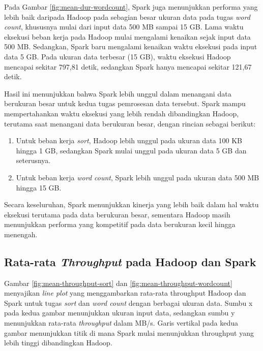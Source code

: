Pada Gambar \ref{fig:mean-dur-wordcount}, Spark juga menunjukkan performa yang lebih baik daripada Hadoop pada sebagian besar ukuran data pada tugas \textit{word count}, khususnya mulai dari input data 500 MB sampai 15 GB. Lama waktu eksekusi beban kerja pada Hadoop mulai mengalami kenaikan sejak input data 500 MB. Sedangkan, Spark baru mengalami kenaikan waktu eksekusi pada input data 5 GB. Pada ukuran data terbesar (15 GB), waktu eksekusi Hadoop mencapai sekitar 797,81 detik, sedangkan Spark hanya mencapai sekitar 121,67 detik.

Hasil ini menunjukkan bahwa Spark lebih unggul dalam menangani data berukuran besar untuk kedua tugas pemrosesan data tersebut. Spark mampu mempertahankan waktu eksekusi yang lebih rendah dibandingkan Hadoop, terutama saat menangani data berukuran besar, dengan rincian sebagai berikut:
\begin{enumerate}
\item Untuk beban kerja \textit{sort}, Hadoop lebih unggul pada ukuran data 100 KB hingga 1 GB, sedangkan Spark mulai unggul pada ukuran data 5 GB dan seterusnya.
\item Untuk beban kerja \textit{word count}, Spark lebih unggul pada ukuran data 500 MB hingga 15 GB.
\end{enumerate}

Secara keseluruhan, Spark menunjukkan kinerja yang lebih baik dalam hal waktu eksekusi terutama pada data berukuran besar, sementara Hadoop masih menunjukkan performa yang kompetitif pada data berukuran kecil hingga menengah.



\subsection {Rata-rata \textit{Throughput} pada Hadoop dan Spark}

Gambar \ref{fig:mean-throughput-sort} dan \ref{fig:mean-throughput-wordcount} menyajikan \textit{line plot} yang menggambarkan rata-rata throughput Hadoop dan Spark untuk tugas \textit{sort} dan \textit{word count} dengan berbagai ukuran data. Sumbu x pada kedua gambar menunjukkan ukuran input data, sedangkan sumbu y menunjukkan rata-rata \textit{throughput} dalam MB/s. Garis vertikal pada kedua gambar menunjukkan titik di mana Spark mulai menunjukkan throughput yang lebih tinggi dibandingkan Hadoop.

